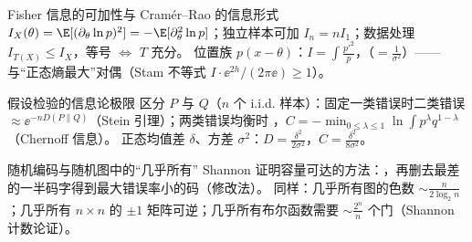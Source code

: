 \begin{结论}{Fisher 信息的可加性与 Cramér--Rao 的信息形式}
$I_X(\theta)=\E[(\partial_\theta\ln p)^2]=-\E[\partial_\theta^2\ln p]$；独立样本可加 $I_n=nI_1$；数据处理 $I_{T(X)}\le I_X$，等号 $\iff$ $T$ 充分。
位置族 $p(x-\theta)$：$I=\int\frac{p'^2}{p}$，（$=\frac1{\sigma^2}$）——与“正态熵最大”对偶（Stam 不等式 $I\cdot\ee^{2h}/(2\pi\ee)\ge1$）。
\end{结论}

\begin{结论}{假设检验的信息论极限}
区分 $P$ 与 $Q$（$n$ 个 i.i.d. 样本）：固定一类错误时二类错误 $\approx\ee^{-nD(P\|Q)}$（Stein 引理）；两类错误均衡时 ，$C=-\min_{0\le\lambda\le1}\ln\int p^\lambda q^{1-\lambda}$（Chernoff 信息）。
正态均值差 $\delta$、方差 $\sigma^2$：$D=\frac{\delta^2}{2\sigma^2}$，$C=\frac{\delta^2}{8\sigma^2}$。
\end{结论}

\begin{结论}{随机编码与随机图中的“几乎所有”}
Shannon 证明容量可达的方法：，再删去最差的一半码字得到最大错误率小的码（修改法）。
同样：几乎所有图的色数 $\sim\frac{n}{2\log_2n}$；几乎所有 $n\times n$ 的 $\pm1$ 矩阵可逆；几乎所有布尔函数需要 $\sim\frac{2^n}n$ 个门（Shannon 计数论证）。
\end{结论}

